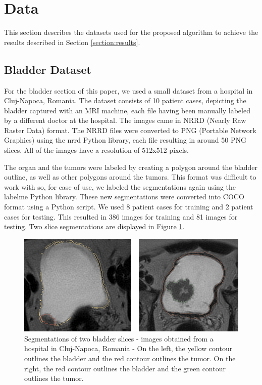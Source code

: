 \documentclass[runningheads,a4paper,11pt]{report}
\begin{document}
\section{Data}
\label{section:data}

This section describes the datasets used for the proposed algorithm to achieve the results described in Section \ref{section:results}.

\subsection{Bladder Dataset}\label{bladderdata}

For the bladder section of this paper, we used a small dataset from a hospital in Cluj-Napoca, Romania. The dataset consists of 10 patient cases, depicting the bladder captured with an MRI machine, each file having been manually labeled by a different doctor at the hospital. The images came in NRRD (Nearly Raw Raster Data) format. The NRRD files were converted to PNG (Portable Network Graphics) using the nrrd Python library, each file resulting in around 50 PNG slices. All of the images have a resolution of 512x512 pixels.

The organ and the tumors were labeled by creating a polygon around the bladder outline, as well as other polygons around the tumors. This format was difficult to work with so, for ease of use, we labeled the segmentations again using the labelme Python library. These new segmentations were converted into COCO format using a Python script. We used 8 patient cases for training and 2 patient cases for testing. This resulted in 386 images for training and 81 images for testing. Two slice segmentations are displayed in Figure \ref{bladder_1}.

\begin{figure}[htbp]
	\centerline{\includegraphics[width=14cm]{images/bladder_1.png}}
	\caption{Segmentations of two bladder slices - images obtained from a hospital in Cluj-Napoca, Romania - On the left, the yellow contour outlines the bladder and the red contour outlines the tumor. On the right, the red contour outlines the bladder and the green contour outlines the tumor.}
	\label{bladder_1}
\end{figure}
\end{document}
